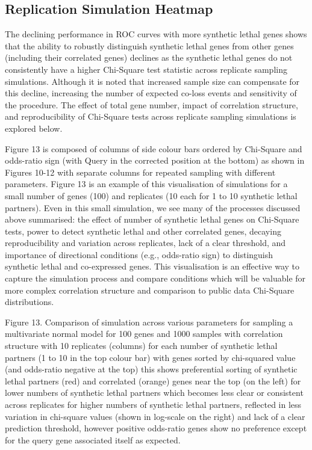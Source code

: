 \subsection{Replication Simulation Heatmap}

The declining performance in \gls{ROC} curves with more \gls{synthetic lethal} genes shows that the ability to robustly distinguish \gls{synthetic lethal} genes from other genes (including their correlated genes) declines as the \gls{synthetic lethal} genes do not consistently have a higher Chi-Square test statistic across replicate sampling simulations.  Although it is noted that increased sample size can compensate for this decline, increasing the number of expected co-loss events and sensitivity of the procedure.  The effect of total gene number, impact of correlation structure, and reproducibility of Chi-Square tests across replicate sampling simulations is explored below.

Figure 13 is composed of columns of side colour bars ordered by Chi-Square and odds-ratio sign (with Query in the corrected position at the bottom) as shown in Figures 10-12 with separate columns for repeated sampling with different parameters.  Figure 13 is an example of this visualisation of simulations for a small number of genes (100) and replicates (10 each for 1 to 10 \gls{synthetic lethal} partners).  Even in this small simulation, we see many of the processes discussed above summarised: the effect of number of \gls{synthetic lethal} genes on Chi-Square tests, power to detect \gls{synthetic lethal} and other correlated genes, decaying reproducibility and variation across replicates, lack of a clear threshold, and importance of directional conditions (e.g., odds-ratio sign) to distinguish \gls{synthetic lethal} and co-expressed genes.  This visualisation is an effective way to capture the simulation process and compare conditions which will be valuable for more complex correlation structure and comparison to public data Chi-Square distributions.
    
Figure 13.  Comparison of simulation across various parameters for sampling a multivariate normal model for 100 genes and 1000 samples with correlation structure with 10 replicates (columns) for each number of \gls{synthetic lethal} partners (1 to 10 in the top colour bar) with genes sorted by chi-squared value (and odds-ratio negative at the top) this shows preferential sorting of \gls{synthetic lethal} partners (red) and correlated (orange) genes near the top (on the left) for lower numbers of \gls{synthetic lethal} partners which becomes less clear or consistent across replicates for higher numbers of \gls{synthetic lethal} partners, reflected in less variation in chi-square values (shown in log-scale on the right) and lack of a clear prediction threshold, however positive odds-ratio genes show no preference except for the query gene associated itself as expected.

